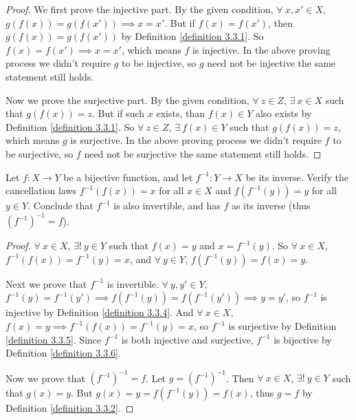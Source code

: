 \begin{proof}
We first prove the injective part.
By the given condition, \(\forall\ x, x' \in X\), \(g(f(x)) = g(f(x')) \implies x = x'\).
But if \(f(x) = f(x')\), then \(g(f(x)) = g(f(x'))\) by Definition \ref{definition 3.3.1}.
So \(f(x) = f(x') \implies x = x'\), which means \(f\) is injective.
In the above proving process we didn't require \(g\) to be injective, so \(g\) need not be injective the same statement still holds.

Now we prove the surjective part.
By the given condition, \(\forall\ z \in Z\), \(\exists\ x \in X\) such that \(g(f(x)) = z\).
But if such \(x\) exists, than \(f(x) \in Y\) also exists by Definition \ref{definition 3.3.1}.
So \(\forall\ z \in Z\), \(\exists\ f(x) \in Y\) such that \(g(f(x)) = z\), which means \(g\) is surjective.
In the above proving process we didn't require \(f\) to be surjective, so \(f\) need not be surjective the same statement still holds.
\end{proof}

\begin{exercise}\label{exercise 3.3.6}
Let \(f : X \to Y\) be a bijective function, and let \(f^{-1} : Y \to X\) be its inverse.
Verify the cancellation laws \(f^{-1}(f(x)) = x\) for all \(x \in X\) and \(f(f^{-1}(y)) = y\) for all \(y \in Y\).
Conclude that \(f^{-1}\) is also invertible, and has \(f\) as its inverse (thus \((f^{-1})^{-1} = f\)).
\end{exercise}

\begin{proof}
\(\forall\ x \in X\), \(\exists!\ y \in Y\) such that \(f(x) = y\) and \(x = f^{-1}(y)\).
So \(\forall\ x \in X\), \(f^{-1}(f(x)) = f^{-1}(y) = x\), and \(\forall\ y \in Y\), \(f(f^{-1}(y)) = f(x) = y\).

Next we prove that \(f^{-1}\) is invertible.
\(\forall\ y, y' \in Y\), \(f^{-1}(y) = f^{-1}(y') \implies f(f^{-1}(y)) = f(f^{-1}(y')) \implies y = y'\), so \(f^{-1}\) is injective by Definition \ref{definition 3.3.4}.
And \(\forall\ x \in X\), \(f(x) = y \implies f^{-1}(f(x)) = f^{-1}(y) = x\), so \(f^{-1}\) is surjective by Definition \ref{definition 3.3.5}.
Since \(f^{-1}\) is both injective and surjective, \(f^{-1}\) is bijective by Definition \ref{definition 3.3.6}.

Now we prove that \((f^{-1})^{-1} = f\).
Let \(g = (f^{-1})^{-1}\).
Then \(\forall\ x \in X\), \(\exists!\ y \in Y\) such that \(g(x) = y\).
But \(g(x) = y = f(f^{-1}(y)) = f(x)\), thus \(g = f\) by Definition \ref{definition 3.3.2}.
\end{proof}

